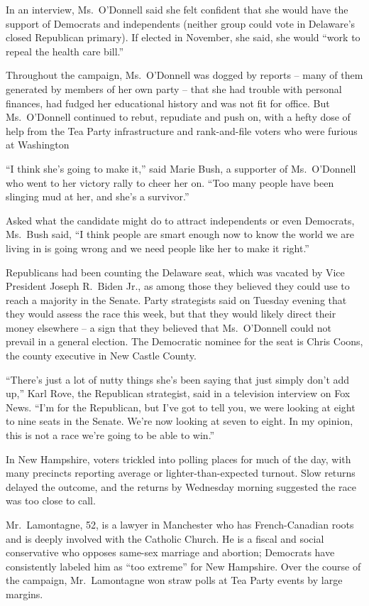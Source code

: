 ﻿\documentclass[12pt]{article}
\begin{document}
In an interview, Ms.~O'Donnell said she felt confident that she would have the support of Democrats
and independents (neither group could vote in Delaware's closed Republican primary). If elected in
November, she said, she would ``work to repeal the health care bill.''

Throughout the campaign, Ms.~O'Donnell was dogged by reports -- many of them generated by members of
her own party -- that she had trouble with personal finances, had fudged her educational history and
was not fit for office. But Ms.~O'Donnell continued to rebut, repudiate and push on, with a hefty
dose of help from the Tea Party infrastructure and rank-and-file voters who were furious at
Washington

``I think she's going to make it,'' said Marie Bush, a supporter of Ms.~O'Donnell who went to her
victory rally to cheer her on. ``Too many people have been slinging mud at her, and she's a
survivor.''

Asked what the candidate might do to attract independents or even Democrats, Ms.~Bush said, ``I
think people are smart enough now to know the world we are living in is going wrong and we need
people like her to make it right.''

Republicans had been counting the Delaware seat, which was vacated by Vice President Joseph R.~Biden
Jr., as among those they believed they could use to reach a majority in the Senate. Party
strategists said on Tuesday evening that they would assess the race this week, but that they would
likely direct their money elsewhere -- a sign that they believed that Ms.~O'Donnell could not
prevail in a general election. The Democratic nominee for the seat is Chris Coons, the county
executive in New Castle County.

``There's just a lot of nutty things she's been saying that just simply don't add up,'' Karl Rove,
the Republican strategist, said in a television interview on Fox News. ``I'm for the Republican, but
I've got to tell you, we were looking at eight to nine seats in the Senate. We're now looking at
seven to eight. In my opinion, this is not a race we're going to be able to win.''

In New Hampshire, voters trickled into polling places for much of the day, with many precincts
reporting average or lighter-than-expected turnout. Slow returns delayed the outcome, and the
returns by Wednesday morning suggested the race was too close to call.

Mr.~Lamontagne, 52, is a lawyer in Manchester who has French-Canadian roots and is deeply involved
with the Catholic Church. He is a fiscal and social conservative who opposes same-sex marriage and
abortion; Democrats have consistently labeled him as ``too extreme'' for New Hampshire. Over the
course of the campaign, Mr.~Lamontagne won straw polls at Tea Party events by large margins.
\end{document}
